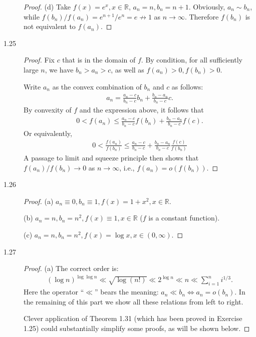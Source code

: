 \documentclass{article}
\newcommand{\real}{\mathbb{R}}
\theoremstyle{definition}
\theoremstyle{plain}
\theoremstyle{remark}
\begin{document}
\begin{description}
\begin{proof}
(d) Take $f(x) = e^x, x \in \real$, $a_n = n, b_n = n + 1$. Obviously, $a_n \sim b_n$, while
$f(b_n)/f(a_n) = e^{n + 1}/e^n = e \not\to 1$ as $n \to \infty$. Therefore $f(b_n)$ is not
equivalent to $f(a_n)$.
\end{proof}

\item[1.25]
\begin{proof}
Fix $c$ that is in the domain of $f$. By condition, for all sufficiently large $n$, we have
$b_n > a_n > c$, as well as $f(a_n) > 0, f(b_n) > 0$.

Write $a_n$ as the convex combination of $b_n$ and $c$ as follows:
\begin{align*}
    a_n = \frac{a_n - c}{b_n - c}b_n + \frac{b_n - a_n}{b_n - c}c.
\end{align*}
By convexity of $f$ and the expression above, it follows that
\begin{align*}
    0 < f(a_n) \leq \frac{a_n - c}{b_n - c}f(b_n) + \frac{b_n - a_n}{b_n - c}f(c).
\end{align*}
Or equivalently,
\begin{align*}
    0 < \frac{f(a_n)}{f(b_n)} \leq \frac{a_n - c}{b_n - c} + 
    \frac{b_n - a_n}{b_n - c}\frac{f(c)}{f(b_n)}
\end{align*}
A passage to limit and squeeze principle then shows that $f(a_n)/f(b_n) \to 0$ as $n \to 
\infty$, i.e., $f(a_n) = o(f(b_n))$.
\end{proof}

\item[1.26]
\begin{proof}
(a) $a_n \equiv 0, b_n \equiv 1, f(x) = 1 + x^2, x \in \real$.

(b) $a_n = n, b_n = n^2, f(x) \equiv 1, x \in \real$ ($f$ is a constant function).

(c) $a_n = n, b_n = n^2, f(x) = \log x, x \in (0, \infty)$.
\end{proof}

\item[1.27]
\begin{proof}
(a) The correct order is:
\begin{align*}
    (\log n)^{\log\log n} \ll \sqrt{\log(n!)} \ll 2^{\log n} \ll n \ll 
    \sum_{i = 1}^n i^{1/3}.
\end{align*}
Here the operator ``$\ll$'' bears the meaning: $a_n \ll b_n \iff a_n = o(b_n)$. In the
remaining of this part we show all these relations from left to right.

Clever application of Theorem 1.31 (which has been proved in Exercise 1.25) could substantially simplify some proofs, as will be
shown below.


\end{proof}
\end{description}
\end{document}
